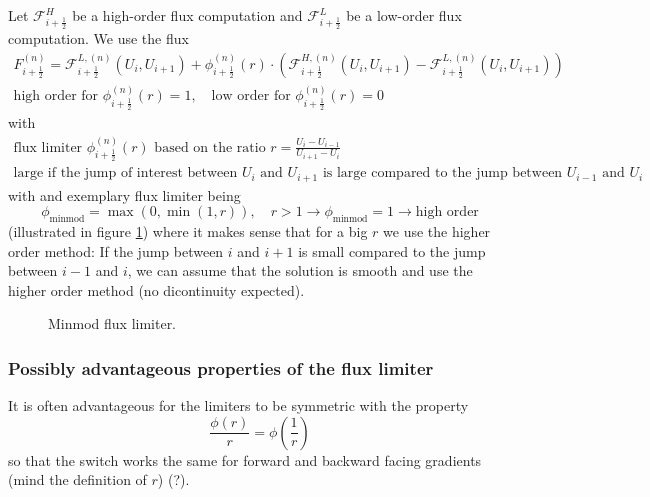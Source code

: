 Let $\mathcal{F}^H_{i+\frac{1}{2}}$ be a high-order flux computation and $\mathcal{F}^L_{i+\frac{1}{2}}$ be a low-order flux computation.
We use the flux
\begin{equation}
    \begin{gathered}
        F_{i+\frac{1}{2}}^{(n)}=\mathcal{F}_{i+\frac{1}{2}}^{L,(n)}\left(U_i, U_{i+1}\right)+\phi_{i+\frac{1}{2}}^{(n)}(r) \cdot\left(\mathcal{F}_{i+\frac{1}{2}}^{H,(n)}\left(U_i, U_{i+1}\right)-\mathcal{F}_{i+\frac{1}{2}}^{L,(n)}\left(U_i, U_{i+1}\right)\right) \\
        \text{high order for } \phi_{i+\frac{1}{2}}^{(n)}(r) = 1, \quad \text{low order for } \phi_{i+\frac{1}{2}}^{(n)}(r) = 0
    \end{gathered}
\end{equation}
with
\begin{equation}
    \begin{gathered}
        \text{flux limiter } \phi_{i+\frac{1}{2}}^{(n)}(r) \text{ based on the ratio } r = \frac{U_i - U_{i-1}}{U_{i+1} - U_{i}} \\
        \text{large if the jump of interest between } U_i \text{ and } U_{i+1} \text{ is large compared to the jump between } U_{i-1} \text{ and } U_{i}
    \end{gathered}
\end{equation}
with and exemplary flux limiter being
\begin{equation}
    \phi_{\text{minmod}} = \max(0, \min(1, r)), \quad r > 1 \rightarrow \phi_{\text{minmod}} = 1 \rightarrow \text{high order}
\end{equation}
(illustrated in figure \ref{fig:minmod}) where it makes sense that for a big $r$ we use the higher order method: \textcolor{blue1}{If the jump between $i$ and $i+1$ is small compared to the jump between $i-1$ and $i$, we can assume that the solution is smooth and use the higher order method (no dicontinuity expected).}

\begin{figure}[htb!]
    \centering
    
    \caption{Minmod flux limiter.}
    \label{fig:minmod}
\end{figure}


\subsubsection{Possibly advantageous properties of the flux limiter}
It is often advantageous for the limiters to be symmetric with the property
\begin{equation}
    \frac{\phi(r)}{r} = \phi \left( \frac{1}{r} \right)
\end{equation}
so that the switch works the same for forward and backward facing
gradients (mind the definition of $r$) (?).

